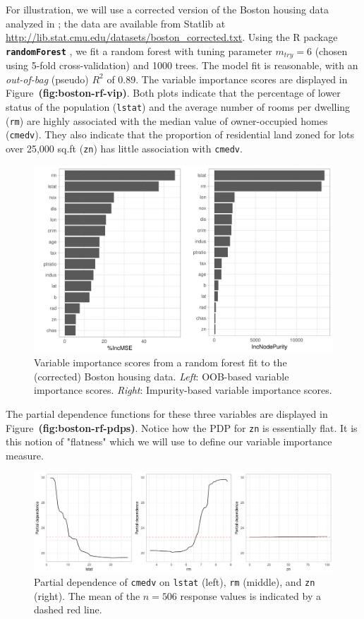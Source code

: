 \documentclass[12pt]{article}
\def\code#1{\texttt{#1}}
\def\pkg#1{\textbf{\texttt{#1}}}
\def\ref#1{\textbf{(#1)}}
\begin{document}
For illustration, we will use a corrected version of the Boston housing data analyzed in \citet{harrison-1978-hedonic}; the data are available from Statlib at \url{http://lib.stat.cmu.edu/datasets/boston_corrected.txt}. Using the R package \pkg{randomForest} \citep{randomForest-pkg}, we fit a random forest with tuning parameter $m_{try} = 6$ (chosen using 5-fold cross-validation) and 1000 trees. The model fit is reasonable, with an \textit{out-of-bag} (pseudo) $R^2$ of 0.89. The variable importance scores are displayed in Figure~\ref{fig:boston-rf-vip}. Both plots indicate that the percentage of lower status of the population (\code{lstat}) and the average number of rooms per dwelling (\code{rm}) are highly associated with the median value of owner-occupied homes (\code{cmedv}). They also indicate that the proportion of residential land zoned for lots over 25,000 sq.ft (\code{zn}) has little association with \code{cmedv}.
\begin{figure}[!htb]
  \label{boston-rf-vip}
  \centering
  \includegraphics[width=1.0\textwidth]{boston-rf-vip}
  \caption{Variable importance scores from a random forest fit to the (corrected) Boston housing data. \textit{Left}: OOB-based variable importance scores. \textit{Right}: Impurity-based variable importance scores.}
\end{figure}

The partial dependence functions for these three variables are displayed in Figure~\ref{fig:boston-rf-pdps}. Notice how the PDP for \code{zn} is essentially flat. It is this notion of "flatness" which we will use to define our variable importance measure.
\begin{figure}[!htb]
  \label{boston-rf-pdps}
  \centering
  \includegraphics[width=1.0\textwidth]{boston-rf-pdps}
  \caption{Partial dependence of \code{cmedv} on \code{lstat} (left), \code{rm} (middle), and \code{zn} (right). The mean of the $n = 506$ response values is indicated by a dashed red line.}
\end{figure}
\end{document}
